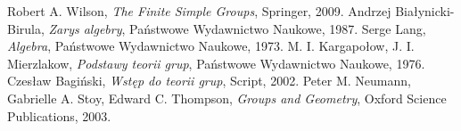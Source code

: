 \documentclass[licencjacka]{pracamgr}
\begin{document}
\begin{thebibliography}{99}

 Robert A. Wilson, \textit{The Finite Simple Groups}, Springer, 2009.
 Andrzej Białynicki-Birula, \textit{Zarys algebry}, Państwowe Wydawnictwo Naukowe, 1987.
 Serge Lang, \textit{Algebra}, Państwowe Wydawnictwo Naukowe, 1973.
 M. I. Kargapołow, J. I. Mierzlakow, \textit{Podstawy teorii grup}, Państwowe Wydawnictwo Naukowe, 1976.
 Czesław Bagiński, \textit{Wstęp do teorii grup}, Script, 2002.
 Peter M. Neumann, Gabrielle A. Stoy, Edward C. Thompson, \textit{Groups and Geometry}, Oxford Science Publications, 2003.

\end{thebibliography}
\end{document}
